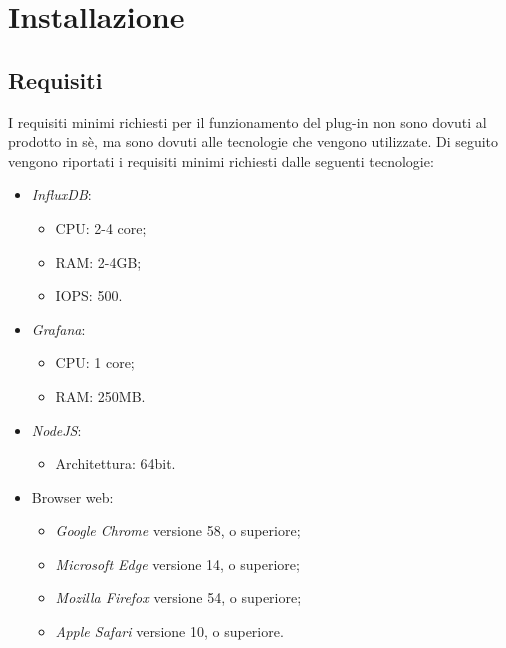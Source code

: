 \section{Installazione}\label{Installazione}

\subsection{Requisiti}\label{Requisiti}
I requisiti minimi richiesti per il funzionamento del plug-in non sono dovuti al prodotto in sè, ma sono dovuti alle tecnologie che vengono utilizzate. Di seguito vengono riportati i requisiti minimi richiesti dalle seguenti tecnologie:
\begin{itemize}
	\item \textit{InfluxDB}:
	\begin{itemize}
		\item CPU: 2-4 core;
		\item RAM: 2-4GB;
		\item IOPS: 500.
	\end{itemize}
	\item \textit{Grafana}:
	\begin{itemize}
		\item CPU: 1 core;
		\item RAM: 250MB.
	\end{itemize}
	\item \textit{NodeJS}:
	\begin{itemize}
		\item Architettura: 64bit.
	\end{itemize}
	\item Browser web:
	\begin{itemize}
		\item \textit{Google Chrome} versione 58, o superiore;
		\item \textit{Microsoft Edge} versione 14, o superiore;
		\item \textit{Mozilla Firefox} versione 54, o superiore;
		\item \textit{Apple Safari} versione 10, o superiore.
	\end{itemize}
\end{itemize}

